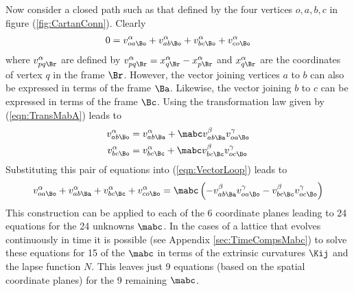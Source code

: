 \documentclass[a4paper,12pt]{article}
\numberwithin{equation}{section}
\begin{document}
Now consider a closed path such as that defined by the four vertices $o,a,b,c$ in figure
(\ref{fig:CartanConn}). Clearly
\begin{align}
   \label{eqn:VectorLoop}
   0 = v^\alpha_{oa\Bo} + v^\alpha_{ab\Bo} + v^\alpha_{bc\Bo} + v^\alpha_{co\Bo}
\end{align}
where $v^\alpha_{pq\Br}$ are defined by $v^\alpha_{pq\Br} =
x^\alpha_{q\Br}-x^\alpha_{p\Br}$ and $x^\alpha_{q\Br}$ are the coordinates of vertex $q$ in
the frame $\Br$. However, the vector joining vertices $a$ to $b$ can also be expressed in
terms of the frame $\Ba$. Likewise, the vector joining $b$ to $c$ can be expressed in terms
of the frame $\Bc$. Using the transformation law given by (\ref{eqn:TransMabA}) leads to
\begin{align}
   v^\alpha_{ab\Bo} &= v^\alpha_{ab\Ba} + \mabc v^\beta_{ab\Ba} v^\gamma_{oa\Bo}\\
   v^\alpha_{bc\Bo} &= v^\alpha_{bc\Bc} + \mabc v^\beta_{bc\Bc} v^\gamma_{oc\Bo}
\end{align}
Substituting this pair of equations into (\ref{eqn:VectorLoop}) leads to
\begin{align}
   \label{eqn:SimpleMabcEqtns}
   v^\alpha_{oa\Bo} + v^\alpha_{ab\Ba} + v^\alpha_{bc\Bc} + v^\alpha_{co\Bo}
   =
   \mabc\left(-v^\beta_{ab\Ba} v^\gamma_{oa\Bo}
              -v^\beta_{bc\Bc} v^\gamma_{oc\Bo}\right)
\end{align}
This construction can be applied to each of the 6 coordinate planes leading to 24 equations
for the 24 unknowns $\mabc$. In the cases of a lattice that evolves continuously in time it
is possible (see Appendix \ref{sec:TimeCompsMabc}) to solve these equations for 15 of the
$\mabc$ in terms of the extrinsic curvatures $\Kij$ and the lapse function $N$. This leaves
just 9 equations (based on the spatial coordinate planes) for the 9 remaining $\mabc$.
\end{document}
